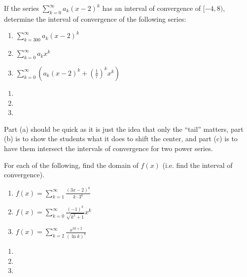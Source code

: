 \documentclass[]{ximera}
\begin{document}
\begin{problem}
If the series $\sum_{k=0}^\infty a_k (x-2)^k$ has an interval of convergence of $[-4,8)$, determine the interval of convergence of the following series:
	\begin{multicols}{3}
	\begin{enumerate}
	\item  $\sum_{k=300}^\infty a_k (x-2)^k$
	\item  $\sum_{k=0}^\infty a_k x^k$
	\item  $\sum_{k=0}^\infty \left( a_k (x-2)^k + \left( \frac{1}{7} \right)^k x^k \right)$
	\end{enumerate}
	\end{multicols}
	
	\begin{freeResponse}
	\begin{enumerate}
	\item
	
	\item
	
	\item
	\end{enumerate}
	\end{freeResponse}
	
\end{problem}

\begin{instructorNotes}
Part (a) should be quick as it is just the idea that only the ``tail'' matters, part (b) is to show the students what it does to shift the center, and part (c) is to have them intersect the intervals of convergence for two power series.
\end{instructorNotes}







\begin{problem}
For each of the following, find the domain of $f(x)$ (i.e. find the interval of convergence).
	\begin{multicols}{2}
	\begin{enumerate}
	\item  $f(x) = \sum_{k=1}^\infty \frac{(3x-2)^k}{k \cdot 3^k}$
	\item  $f(x) = \sum_{k=0}^\infty \frac{(-1)^k}{\sqrt{k^2+1}} x^k$
	\item  $f(x) = \sum_{k=2}^\infty \frac{x^{3k+2}}{(\ln k)^k}$
	\end{enumerate}
	\end{multicols}
	
	\begin{freeResponse}
	\begin{enumerate}
	\item
	
	\item
	
	\item
	\end{enumerate}
	\end{freeResponse}
		
\end{problem}
\end{document}
